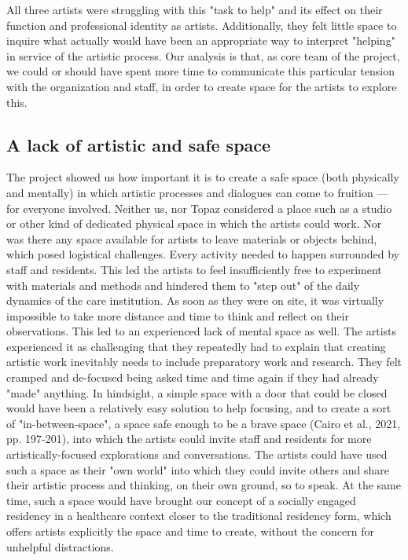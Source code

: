 \documentclass[authordate, empirical]{jote-new-article}
\begin{document}
{	All three artists were struggling with this "task to help" and its effect on their function and professional identity as artists. Additionally, they felt little space to inquire what actually would have been an appropriate way to interpret "helping" in service of the artistic process. Our analysis is that, as core team of the project, we could or should have spent more time to communicate this particular tension with the organization and staff, in order to create space for the artists to explore this.



	\subsection{A lack of artistic and safe space}



	The project showed us how important it is to create a safe space (both physically and mentally) in which artistic processes and dialogues can come to fruition --- for everyone involved. Neither us, nor Topaz considered a place such as a studio or other kind of dedicated physical space in which the artists could work. Nor was there any space available for artists to leave materials or objects behind, which posed logistical challenges. Every activity needed to happen surrounded by staff and residents. This led the artists to feel insufficiently free to experiment with materials and methods and hindered them to "step out" of the daily dynamics of the care institution. As soon as they were on site, it was virtually impossible to take more distance and time to think and reflect on their observations. This led to an experienced lack of mental space as well. The artists experienced it as challenging that they repeatedly had to explain that creating artistic work inevitably needs to include preparatory work and research. They felt cramped and de-focused being asked time and time again if they had already "made" anything. In hindsight, a simple space with a door that could be closed would have been a relatively easy solution to help focusing, and to create a sort of "in-between-space", a space safe enough to be a brave space (Cairo et al., 2021, pp. 197-201), into which the artists could invite staff and residents for more artistically-focused explorations and conversations. The artists could have used such a space as their "own world" into which they could invite others and share their artistic process and thinking, on their own ground, so to speak. At the same time, such a space would have brought our concept of a socially engaged residency in a healthcare context closer to the traditional residency form, which offers artists explicitly the space and time to create, without the concern for unhelpful distractions.







}
\end{document}
